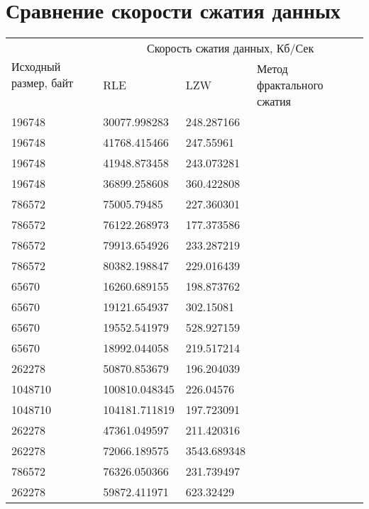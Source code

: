 \documentclass[a4paper,oneside]{article}
\theoremstyle{definition}
\begin{document}
\section{Сравнение скорости сжатия данных}

\begin{table}[H]
  \small
  \centering
  \begin{tabular}{|p{1.5cm}|p{2cm}|p{2cm}|p{2cm}|}
    \hline
    \multirow{2}{1.5cm}{Исходный размер, байт} & \multicolumn{3}{c|}{Скорость сжатия данных, Кб/Сек} \\ \cline{2-4}
                                               & RLE & LZW & Метод фрактального сжатия \\ \hline \hline
    196748  & 30077.998283  & 248.287166  & \\ \hline
    196748  & 41768.415466  & 247.55961   & \\ \hline
    196748  & 41948.873458  & 243.073281  & \\ \hline
    196748  & 36899.258608  & 360.422808  & \\ \hline
    786572  & 75005.79485   & 227.360301  & \\ \hline
    786572  & 76122.268973  & 177.373586  & \\ \hline
    786572  & 79913.654926  & 233.287219  & \\ \hline
    786572  & 80382.198847  & 229.016439  & \\ \hline
    65670   & 16260.689155  & 198.873762  & \\ \hline
    65670   & 19121.654937  & 302.15081   & \\ \hline
    65670   & 19552.541979  & 528.927159  & \\ \hline
    65670   & 18992.044058  & 219.517214  & \\ \hline
    262278  & 50870.853679  & 196.204039  & \\ \hline
    1048710 & 100810.048345 & 226.04576   & \\ \hline
    1048710 & 104181.711819 & 197.723091  & \\ \hline
    262278  & 47361.049597  & 211.420316  & \\ \hline
    262278  & 72066.189575  & 3543.689348 & \\ \hline
    786572  & 76326.050366  & 231.739497  & \\ \hline
    262278  & 59872.411971  & 623.32429   & \\ \hline
  \end{tabular}
\end{table}
\end{document}
